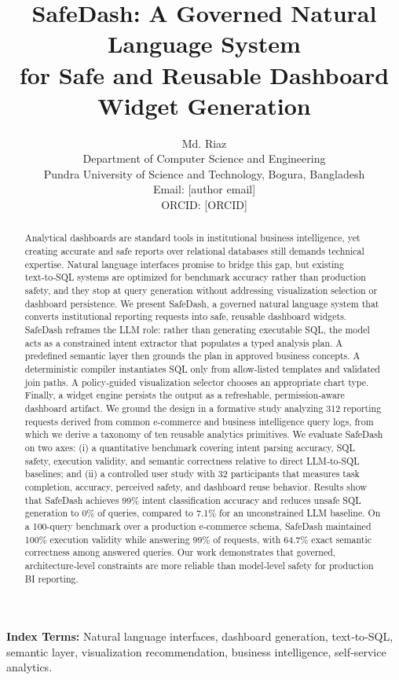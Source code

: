 \documentclass[11pt]{article}
\title{SafeDash: A Governed Natural Language System\\
for Safe and Reusable Dashboard Widget Generation}
\author{Md. Riaz\\
Department of Computer Science and Engineering\\
Pundra University of Science and Technology, Bogura, Bangladesh\\
Email: [author email]\\
ORCID: [ORCID]}
\date{}
\begin{document}
\maketitle

\begin{abstract}
Analytical dashboards are standard tools in institutional business intelligence, yet creating accurate and safe reports over relational databases still demands technical expertise. Natural language interfaces promise to bridge this gap, but existing text‑to‑SQL systems are optimized for benchmark accuracy rather than production safety, and they stop at query generation without addressing visualization selection or dashboard persistence. We present SafeDash, a governed natural language system that converts institutional reporting requests into safe, reusable dashboard widgets. SafeDash reframes the LLM role: rather than generating executable SQL, the model acts as a constrained intent extractor that populates a typed analysis plan. A predefined semantic layer then grounds the plan in approved business concepts. A deterministic compiler instantiates SQL only from allow‑listed templates and validated join paths. A policy‑guided visualization selector chooses an appropriate chart type. Finally, a widget engine persists the output as a refreshable, permission‑aware dashboard artifact. We ground the design in a formative study analyzing 312 reporting requests derived from common e-commerce and business intelligence query logs, from which we derive a taxonomy of ten reusable analytics primitives. We evaluate SafeDash on two axes: (i) a quantitative benchmark covering intent parsing accuracy, SQL safety, execution validity, and semantic correctness relative to direct LLM‑to‑SQL baselines; and (ii) a controlled user study with 32 participants that measures task completion, accuracy, perceived safety, and dashboard reuse behavior. Results show that SafeDash achieves 99\% intent classification accuracy and reduces unsafe SQL generation to 0\% of queries, compared to 7.1\% for an unconstrained LLM baseline. On a 100-query benchmark over a production e‑commerce schema, SafeDash maintained 100\% execution validity while answering 99\% of requests, with 64.7\% exact semantic correctness among answered queries. Our work demonstrates that governed, architecture‑level constraints are more reliable than model‑level safety for production BI reporting.
\end{abstract}

\noindent\textbf{Index Terms:} Natural language interfaces, dashboard generation, text‑to‑SQL, semantic layer, visualization recommendation, business intelligence, self‑service analytics.
\end{document}

